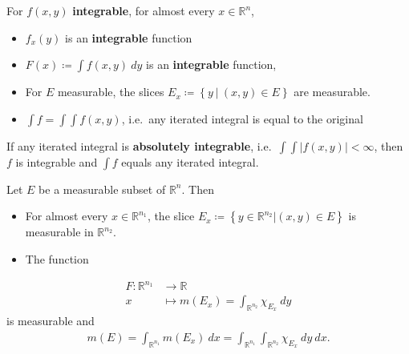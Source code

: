 \begin{theorem}

For \(f(x, y)\) \textbf{integrable}, for almost every
\(x\in {\mathbb{R}}^n\),

\begin{itemize}
\tightlist
\item
  \(f_x(y)\) is an \textbf{integrable} function
\item
  \(F(x) \coloneqq\int f(x, y) ~dy\) is an \textbf{integrable} function,
\item
  For \(E\) measurable, the slices
  \(E_x \coloneqq\left\{{y {~\mathrel{\Big|}~}(x, y) \in E}\right\}\)
  are measurable.
\item
  \(\int f = \int \int f(x,y)\), i.e.~any iterated integral is equal to
  the original
\end{itemize}

\end{theorem}

\begin{theorem}

If any iterated integral is \textbf{absolutely integrable},
i.e.~\(\int \int {\left\lvert {f(x, y)} \right\rvert} < \infty\), then
\(f\) is integrable and \(\int f\) equals any iterated integral.

\end{theorem}

\begin{proposition}

Let \(E\) be a measurable subset of \({\mathbb{R}}^n\). Then

\begin{itemize}
\tightlist
\item
  For almost every \(x\in {\mathbb{R}}^{n_1}\), the slice
  \(E_x \coloneqq\left\{{y \in {\mathbb{R}}^{n_2} \mathrel{\Big|}(x,y) \in E}\right\}\)
  is measurable in \({\mathbb{R}}^{n_2}\).
\item
  The function
\end{itemize}

\begin{align*}
F: {\mathbb{R}}^{n_1} &\to {\mathbb{R}}\\
x &\mapsto m(E_x) = \int_{{\mathbb{R}}^{n_2}} \chi_{E_x} ~dy
\end{align*}
is measurable and
\begin{align*}
m(E) = \int_{{\mathbb{R}}^{n_1}} m(E_x) ~dx 
= \int_{{\mathbb{R}}^{n_1}} \int_{{\mathbb{R}}^{n_2}} \chi_{E_x} ~dy ~dx
.\end{align*}

\end{proposition}

